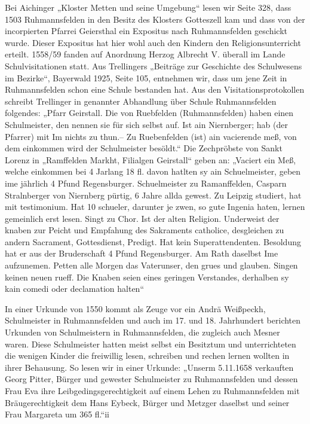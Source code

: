 \documentclass[12pt,a4paper]{book}
\begin{document}
Bei Aichinger „Kloster Metten und seine Umgebung“ lesen wir Seite 328, dass 1503
Ruhmannsfelden in den Besitz des Klosters Gotteszell kam und dass von der
incorpierten Pfarrei Geiersthal ein Expositus nach Ruhmannsfelden geschickt
wurde. Dieser Expositus hat hier wohl auch den Kindern den Religionsunterricht
erteilt. 1558/59 fanden auf Anordnung Herzog Albrecht V. überall im Lande
Schulvisitationen statt. Aus Trellingers „Beiträge zur Geschichte des
Schulwesens im Bezirke“, Bayerwald 1925, Seite 105, entnehmen wir, dass um jene
Zeit in Ruhmannsfelden schon eine Schule bestanden hat. Aus den
Visitationsprotokollen schreibt Trellinger in genannter Abhandlung über Schule
Ruhmannsfelden folgendes: „Pfarr Geirstall. Die von Ruebfelden (Ruhmannsfelden)
haben einen Schulmeister, den nennen sie für sich selbst auf. Ist ain
Niernberger; hab (der Pfarrer) mit Im nichts zu thun.--  Zu Ruebenfelden (ist)
ain vacierende meß, von dem einkommen wird der Schulmeister besöldt.“ Die
Zechpröbste von Sankt Lorenz in „Ramffelden Markht, Filialgen Geirstall“ geben
an: „Vaciert ein Meß, welche einkommen bei 4 Jarlang 18 fl. davon hatlten sy ain
Schuelmeister, geben ime jährlich 4 Pfund Regensburger. Schuelmeister zu
Ramanffelden, Casparn Stralnberger von Niernberg pürtig, 6 Jahre allda gewest.
Zu Leipzig studiert, hat mit testimonium. Hat 10 schueler, darunter je zwen, so
gute Ingenia haten, lernen gemeinlich erst lesen. Singt zu Chor. Ist der alten
Religion. Underweist der knaben zur Peicht und Empfahung des Sakraments
catholice, desgleichen zu andern Sacrament, Gottesdienst, Predigt. Hat kein
Superattendenten. Besoldung hat er aus der Bruderschaft 4 Pfund Regensburger. Am
Rath daselbst Ime aufzunemen. Petten alle Morgen das Vaterunser, den grues und
glauben. Singen keinen neuen rueff. Die Knaben seien eines geringen Verstandes,
derhalben sy kain comedi oder declamation halten“

In einer Urkunde von 1550 kommt als Zeuge vor ein Andrä Weißpeckh, Schulmeister
in Ruhmannsfelden und auch im 17. und 18. Jahrhundert berichten Urkunden von
Schulmeistern in Ruhmannsfelden, die zugleich auch Mesner waren. Diese
Schulmeister hatten meist selbst ein Besitztum und unterrichteten die wenigen
Kinder die freiwillig lesen, schreiben und rechen lernen wollten in ihrer
Behausung. So lesen wir in einer Urkunde: „Unserm 5.11.1658 verkauften Georg
Pitter, Bürger und gewester Schulmeister zu Ruhmannsfelden und dessen Frau Eva
ihre Leibgedingsgerechtigkeit auf einem Lehen zu Ruhmannsfelden mit
Bräugerechtigkeit dem Hans Eybeck, Bürger und Metzger daselbst und seiner Frau
Margareta um 365 fl.“ii
\end{document}
